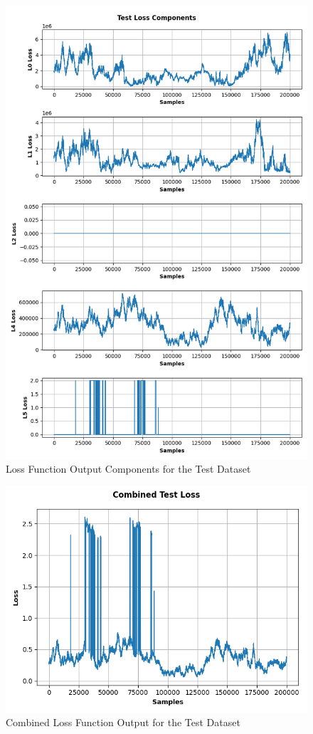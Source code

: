 \documentclass{article}
\begin{document}
\begin{figure}[H]
    \centering
    \includegraphics[scale=0.65]{../best_outputs/losses_fig.png}
    \caption{Loss Function Output Components for the Test Dataset}
    \label{fig:losses}
\end{figure}

\begin{figure}[H]
    \centering
    \includegraphics[scale=0.65]{../best_outputs/test_fig.png}
    \caption{Combined Loss Function Output for the Test Dataset}
    \label{fig:test}
\end{figure}
\end{document}
